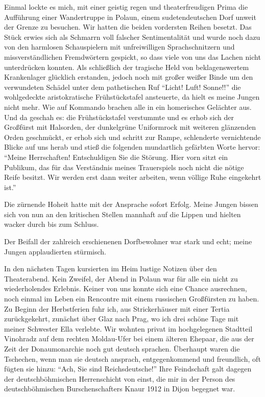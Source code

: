 Einmal lockte es mich, mit einer geistig regen und theaterfreudigen Prima die Aufführung einer Wandertruppe in Polaun, einem sudetendeutschen Dorf unweit der Grenze zu besuchen. Wir hatten die beiden vordersten Reihen besetzt. Das Stück erwies sich als Schmarrn voll falscher Sentimentalität und wurde noch dazu von den harmlosen Schauspielern mit unfreiwilligen Sprachschnitzern und missverständlichen Fremdwörtern gespickt, so dass viele von uns das Lachen nicht unterdrücken konnten. Als schließlich der tragische Held von beklagenswertem Krankenlager glücklich erstanden, jedoch noch mit großer weißer Binde um den verwundeten Schädel unter dem pathetischen Ruf \enquote{Licht! Luft! Sonne!!} die wohlgedeckte aristokratische Frühstückstafel ansteuerte, da hielt es meine Jungen nicht mehr. Wie auf Kommando brachen alle in ein homerisches Gelächter aus. Und da geschah es: die Frühstückstafel verstummte und es erhob sich der Großfürst mit Halsorden, der dunkelgrüne Uniformrock mit weiteren glänzenden Orden geschmückt, er erhob sich und schritt zur Rampe, schlenderte vernichtende Blicke auf uns herab und stieß die folgenden mundartlich gefärbten Worte hervor: \enquote{Meine Herrschaften! Entschuldigen Sie die Störung. Hier vorn sitzt ein Publikum, das für das Verständnis meines Trauerspiels noch nicht die nötige Reife besitzt. Wir werden erst dann weiter arbeiten, wenn völlige Ruhe eingekehrt ist.}

Die zürnende Hoheit hatte mit der Ansprache sofort Erfolg. Meine Jungen bissen sich von nun an den kritischen Stellen mannhaft auf die Lippen und hielten wacker durch bis zum Schluss.

Der Beifall der zahlreich erschienenen Dorfbewohner war stark und echt; meine Jungen applaudierten stürmisch.

In den nächsten Tagen kursierten im Heim lustige Notizen über den Theaterabend. Kein Zweifel, der Abend in Polaun war für alle ein nicht zu wiederholendes Erlebnis. Keiner von uns konnte sich eine Chance ausrechnen, noch einmal im Leben ein Rencontre mit einem russischen Großfürsten zu haben.\\

Zu Beginn der Herbstferien fuhr ich, aus Strickerhäuser mit einer Tertia zurückgekehrt, zunächst über Glaz nach Prag, wo ich drei schöne Tage mit meiner Schwester Ella verlebte. Wir wohnten privat im hochgelegenen Stadtteil Vinohradz auf dem rechten Moldau-Ufer bei einem älteren Ehepaar, die aus der Zeit der Donaumonarchie noch gut deutsch sprachen. Überhaupt waren die Tschechen, wenn man sie deutsch ansprach, entgegenkommend und freundlich, oft fügten sie hinzu: \enquote{Ach, Sie sind Reichsdeutsche!} Ihre Feindschaft galt dagegen der deutschböhmischen Herrenschicht von einst, die mir in der Person des deutschböhmischen Burschenschafters Knaur 1912 in Dijon begegnet war.

